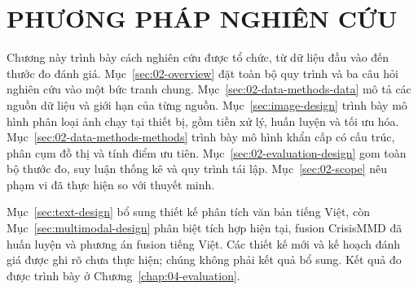\chapter{PHƯƠNG PHÁP NGHIÊN CỨU}\label{chap:02-data-methods}
Chương này trình bày cách nghiên cứu được tổ chức, từ dữ liệu đầu vào đến thước đo đánh giá. Mục~\ref{sec:02-overview} đặt toàn bộ quy trình và ba câu hỏi nghiên cứu vào một bức tranh chung. Mục~\ref{sec:02-data-methods-data} mô tả các nguồn dữ liệu và giới hạn của từng nguồn. Mục~\ref{sec:image-design} trình bày mô hình phân loại ảnh chạy tại thiết bị, gồm tiền xử lý, huấn luyện và tối ưu hóa. Mục~\ref{sec:02-data-methods-methods} trình bày mô hình khẩn cấp có cấu trúc, phân cụm đồ thị và tính điểm ưu tiên. Mục~\ref{sec:02-evaluation-design} gom toàn bộ thước đo, suy luận thống kê và quy trình tái lập. Mục~\ref{sec:02-scope} nêu phạm vi đã thực hiện so với thuyết minh.

Mục~\ref{sec:text-design} bổ sung thiết kế phân tích văn bản tiếng Việt, còn Mục~\ref{sec:multimodal-design} phân biệt tích hợp hiện tại, fusion CrisisMMD đã huấn luyện và phương án fusion tiếng Việt. Các thiết kế mới và kế hoạch đánh giá được ghi rõ chưa thực hiện; chúng không phải kết quả bổ sung. Kết quả đo được trình bày ở Chương~\ref{chap:04-evaluation}.








